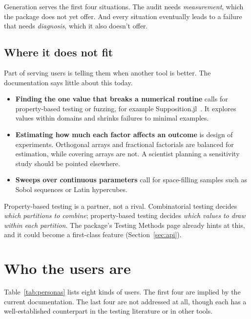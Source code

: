 \documentclass[11pt]{article}
\begin{document}
Generation serves the first four situations. The audit needs
\emph{measurement}, which the package does not yet offer. And every situation
eventually leads to a failure that needs \emph{diagnosis}, which it also
doesn't offer.

\subsection{Where it does not fit}

Part of serving users is telling them when another tool is better. The
documentation says little about this today.

\begin{itemize}[leftmargin=1.5em]
\item \textbf{Finding the one value that breaks a numerical routine} calls for
  property-based testing or fuzzing, for example
  Supposition.jl~\cite{supposition}. It explores values within domains and
  shrinks failures to minimal examples.
\item \textbf{Estimating how much each factor affects an outcome} is design of
  experiments. Orthogonal arrays and fractional factorials are balanced for
  estimation, while covering arrays are not. A scientist planning a
  sensitivity study should be pointed elsewhere.
\item \textbf{Sweeps over continuous parameters} call for space-filling
  samples such as Sobol sequences or Latin hypercubes.
\end{itemize}

Property-based testing is a partner, not a rival. Combinatorial testing
decides \emph{which partitions to combine}; property-based testing decides
\emph{which values to draw within each partition}. The package's Testing
Methods page already hints at this, and it could become a first-class feature
(Section~\ref{sec:api}).

\section{Who the users are}\label{sec:users}

Table~\ref{tab:personas} lists eight kinds of users. The first four are
implied by the current documentation. The last four are not addressed at
all, though each has a well-established counterpart in the testing
literature or in other tools.
\end{document}
